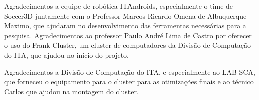\documentclass[
10pt, %
a4paper, %
oneside, %
headinclude,footinclude, %
BCOR5mm, %
]{scrartcl}
\begin{document}
Agradecimentos a equipe de robótica ITAndroids, especialmente o time de Soccer3D juntamente com o Professor
Marcos Ricardo Omena de Albuquerque Maximo, que ajudaram no desenvolvimento das
ferramentas necessárias para a pesquisa.
Agradecimentos ao professor Paulo André Lima de Castro por oferecer o uso do
Frank Cluster, um cluster de computadores da Divisão de Computação do ITA, que ajudou no início do projeto.

Agradecimentos a Divisão de Computação do ITA, e especialmente ao LAB-SCA, que forneceu o equipamento para o cluster para as otimizações finais e ao técnico Carlos que ajudou na montagem do cluster.










\end{document}
